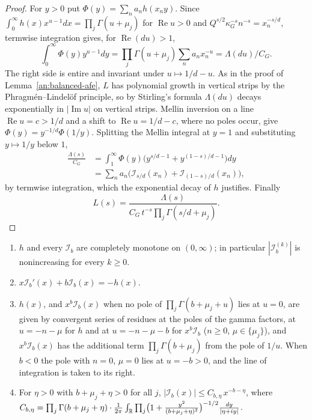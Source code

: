 \begin{proof}
For $y>0$ put $\Phi(y)=\sum_na_nh(x_ny)$. Since
$\int_0^\infty h(x)x^{u-1}dx=\prod_j\Gamma(u+\mu_j)$ for $\operatorname{Re}u>0$
and $Q^{s/2}\kappa_G^{-s}n^{-s}=x_n^{-s/d}$, termwise integration gives, for
$\operatorname{Re}(du)>1$,
\[
 \int_0^\infty\Phi(y)y^{u-1}dy=\prod_j\Gamma(u+\mu_j)\sum_na_nx_n^{-u}
 =\Lambda(du)/C_G.
\]
The right side is entire and invariant under $u\mapsto1/d-u$. As in the
proof of Lemma~\ref{an:balanced-afe}, $L$ has polynomial growth in vertical
strips by the Phragm\'en--Lindel\"of principle, so by Stirling's formula
$\Lambda(du)$ decays exponentially in $|\operatorname{Im}u|$ on vertical
strips. Mellin inversion on a line $\operatorname{Re}u=c>1/d$ and a shift to
$\operatorname{Re}u=1/d-c$, where no poles occur, give
$\Phi(y)=y^{-1/d}\Phi(1/y)$. Splitting the Mellin integral at $y=1$ and
substituting $y\mapsto1/y$ below $1$,
\begin{align*}
 \frac{\Lambda(s)}{C_G}&=\int_1^\infty\Phi(y)\bigl(y^{s/d-1}+y^{(1-s)/d-1}\bigr)dy\\
 &=\sum_na_n\bigl(\mathcal I_{s/d}(x_n)+\mathcal I_{(1-s)/d}(x_n)\bigr),
\end{align*}
by termwise integration, which the exponential decay of $h$ justifies.
Finally
\[
 L(s)=\frac{\Lambda(s)}{C_G\,t^{-s}\prod_j\Gamma(s/d+\mu_j)}.
\]
\end{proof}

\begin{lemma}\label{lv:kernel}
\begin{enumerate}
\item[(a)] $h$ and every $\mathcal I_b$ are completely monotone on
 $(0,\infty)$; in particular $|\mathcal I_b^{(k)}|$ is nonincreasing for every
 $k\ge0$.
\item[(b)] $x\mathcal I_b'(x)+b\mathcal I_b(x)=-h(x)$.
\item[(c)] $h(x)$, and $x^b\mathcal I_b(x)$ when no pole of
 $\prod_j\Gamma(b+\mu_j+u)$ lies at $u=0$, are given by convergent series of
 residues at the poles of the gamma factors, at $u=-n-\mu$ for $h$ and at
 $u=-n-\mu-b$ for $x^b\mathcal I_b$ ($n\ge0$, $\mu\in\{\mu_j\}$), and
 $x^b\mathcal I_b(x)$ has the additional term $\prod_j\Gamma(b+\mu_j)$ from
 the pole of $1/u$. When $b<0$ the pole with $n=0$, $\mu=0$ lies at $u=-b>0$,
 and the line of integration is taken to its right.
\item[(d)] For $\eta>0$ with $b+\mu_j+\eta>0$ for all $j$,
 $|\mathcal I_b(x)|\le C_{b,\eta}\,x^{-b-\eta}$, where
 $C_{b,\eta}=\prod_j\Gamma(b+\mu_j+\eta)\cdot\frac1{2\pi}\int_\mathbb R
 \prod_j\bigl(1+\tfrac{y^2}{(b+\mu_j+\eta)^2}\bigr)^{-1/2}\frac{dy}{|\eta+iy|}$.
\end{enumerate}
\end{lemma}

